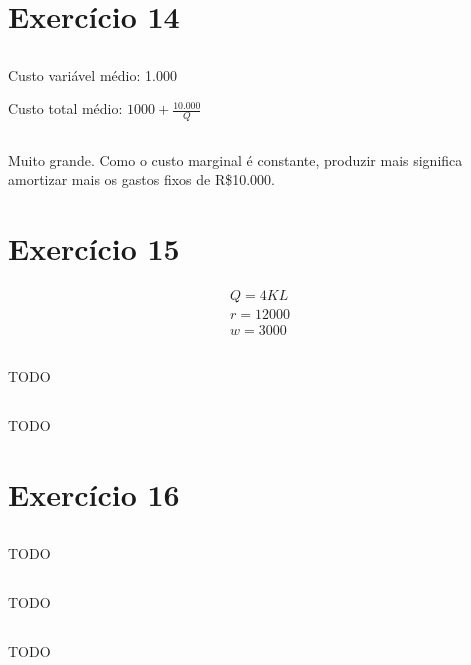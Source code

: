 \documentclass{article}
\begin{document}
\section{Exercício 14}
\subsection{}

Custo variável médio: 1.000

Custo total médio: \(1000 + \frac{10.000}{Q}\)

\subsection{}

Muito grande. Como o custo marginal é constante, produzir mais significa
amortizar mais os gastos fixos de R\$10.000.

\section{Exercício 15}

\[
	\begin{aligned}
		Q = 4KL    \\
		r = 12 000 \\
		w = 3 000
	\end{aligned}
\]

\subsection{}


\subsection{}
TODO
\subsection{}
TODO

\section{Exercício 16}
\subsection{}
TODO
\subsection{}
TODO
\subsection{}
TODO
\end{document}
